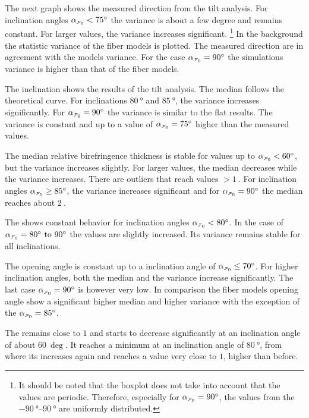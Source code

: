 \par
% 
The next graph shows the measured direction from the tilt analysis.
For inclination angles $\modelInc<\SI{75}{\degree}$ the variance is about a few degree and remains constant.
For larger values, the variance increases significant.
\footnote{It should be noted that the boxplot does not take into account that the values are periodic.
Therefore, especially for $\modelInc=\SI{90}{\degree}$, the values from the $\SIrange{-90}{90}{\degree}$ are uniformly distributed.}
In the background the statistic \bvariance{} variance of the fiber models is plotted.
The measured direction are in agreement with the models variance.
For the case $\modelInc=\SI{90}{\degree}$ the simulations \bvariance{} variance is higher than that of the fiber models.
\par
%
The inclination shows the results of the tilt analysis.
The median follows the theoretical curve.
For inclinations $\SI{80}{\degree}$ and $\SI{85}{\degree}$, the variance increases significantly.
For $\modelInc = \SI{90}{\degree}$ the variance is similar to the flat results.
The \bvariance{} variance is constant and up to a value of $\modelInc=\SI{75}{\degree}$ higher than the measured values.
\par
%
The median relative birefringence thickness \trel{} is stable for values up to $\modelInc < \SI{60}{\degree}$, but the variance increases slightly.
For larger values, the median decreases while the variance increases.
There are outliers that reach values $>\SI{1}{}$.
For inclination angles $\modelInc \ge \SI{85}{\degree}$, the variance increases significant and for $\modelInc = \SI{90}{\degree}$ the median reaches about $\SI{2}{}$.
\par
% 
The \rvalue{} shows constant behavior for inclination angles $\modelInc < \SI{80}{\degree}$.
In the case of $\modelInc=\SIrange[]{80}{90}{\degree}$ the values are slightly increased.
Its variance remains stable for all inclinations.
\par
%
The opening angle \openingAngle{} is constant up to a inclination angle of $\modelInc \le \SI{70}{\degree}$.
For higher inclination angles, both the median and the variance increase significantly.
The last case $\modelInc = \SI{90}{\degree}$ is however very low.
In comparison the fiber models opening angle show a significant higher median and higher \bvariance{} variance with the exception of the $\modelInc=\SI{85}{\degree}$.
\par
% 
The \accvalue{} remains close to $1$ and starts to decrease significantly at an inclination angle of about $\SI{60}{\deg}$.
It reaches a minimum at an inclination angle of $\SI{80}{\degree}$, from where its increases again and reaches a value very close to $1$, higher than before.
%
%
%
